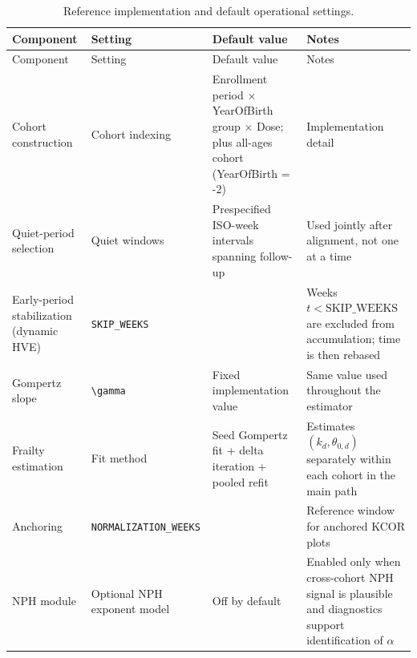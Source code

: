 \documentclass[
]{article}
\begin{document}
\begin{longtable}[]{@{}
  >{\raggedright\arraybackslash}p{}
  >{\raggedright\arraybackslash}p{}
  >{\raggedright\arraybackslash}p{}
  >{\raggedright\arraybackslash}p{}@{}}
\caption{Reference implementation and default operational
settings.}\label{tbl:si_defaults}\tabularnewline
\toprule\noalign{}
\begin{minipage}[b]{\linewidth}\raggedright
Component
\end{minipage} & \begin{minipage}[b]{\linewidth}\raggedright
Setting
\end{minipage} & \begin{minipage}[b]{\linewidth}\raggedright
Default value
\end{minipage} & \begin{minipage}[b]{\linewidth}\raggedright
Notes
\end{minipage} \\
\midrule\noalign{}
\endfirsthead
\toprule\noalign{}
\begin{minipage}[b]{\linewidth}\raggedright
Component
\end{minipage} & \begin{minipage}[b]{\linewidth}\raggedright
Setting
\end{minipage} & \begin{minipage}[b]{\linewidth}\raggedright
Default value
\end{minipage} & \begin{minipage}[b]{\linewidth}\raggedright
Notes
\end{minipage} \\
\midrule\noalign{}
\endhead
\bottomrule\noalign{}
\endlastfoot
Cohort construction & Cohort indexing & Enrollment period × YearOfBirth
group × Dose; plus all-ages cohort (YearOfBirth = -2) & Implementation
detail \\
Quiet-period selection & Quiet windows & Prespecified ISO-week intervals
spanning follow-up & Used jointly after alignment, not one at a time \\
Early-period stabilization (dynamic HVE) & \texttt{SKIP\_WEEKS} & 2 &
Weeks \(t < \mathrm{SKIP\_WEEKS}\) are excluded from accumulation; time
is then rebased \\
Gompertz slope & \texttt{\textbackslash{}gamma} & Fixed implementation
value & Same value used throughout the estimator \\
Frailty estimation & Fit method & Seed Gompertz fit + delta iteration +
pooled refit & Estimates \((k_d,\theta_{0,d})\) separately within each
cohort in the main path \\
Anchoring & \texttt{NORMALIZATION\_WEEKS} & 4 & Reference window for
anchored KCOR plots \\
NPH module & Optional NPH exponent model & Off by default & Enabled only
when cross-cohort NPH signal is plausible and diagnostics support
identification of \(\alpha\) \\
\end{longtable}
\end{document}
